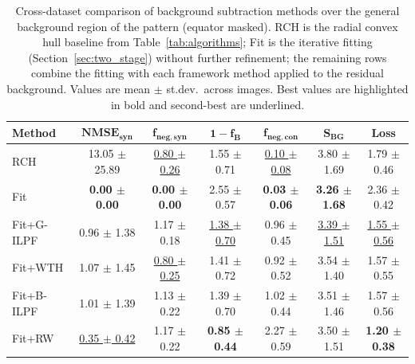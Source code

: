 \documentclass[journal,article,submit,moreauthors]{Definitions/mdpi}
\begin{document}
\begin{table}[H]
\caption{Cross-dataset comparison of background subtraction methods over the general background region of the pattern (equator masked). RCH is the radial convex hull baseline from Table~\ref{tab:algorithms}; Fit is the iterative fitting (Section~\ref{sec:two_stage}) without further refinement; the remaining rows combine the fitting with each framework method applied to the residual background. Values are mean $\pm$ st.dev.\ across images. Best values are highlighted in bold and second-best are underlined.}
\label{tab:two_stage_full}
\centering
\small
\setlength{\tabcolsep}{3pt}
\renewcommand{\arraystretch}{1.1}
\begin{tabular}{@{}lcccccc@{}}
\toprule
\textbf{Method} & $\mathbf{NMSE}_{\mathbf{syn}}$ & $\mathbf{f}_{\mathbf{neg,syn}}$ & $\mathbf{1-f_B}$ & $\mathbf{f}_{\mathbf{neg,con}}$ & $\mathbf{S}_{\mathbf{BG}}$ & \textbf{Loss} \\
\midrule
RCH & 13.05 $\pm$ 25.89 & \underline{0.80 $\pm$ 0.26} & 1.55 $\pm$ 0.71 & \underline{0.10 $\pm$ 0.08} & 3.80 $\pm$ 1.69 & 1.79 $\pm$ 0.46 \\
Fit & \textbf{0.00 $\pm$ 0.00} & \textbf{0.00 $\pm$ 0.00} & 2.55 $\pm$ 0.57 & \textbf{0.03 $\pm$ 0.06} & \textbf{3.26 $\pm$ 1.68} & 2.36 $\pm$ 0.42 \\
Fit+G-ILPF & 0.96 $\pm$ 1.38 & 1.17 $\pm$ 0.18 & \underline{1.38 $\pm$ 0.70} & 0.96 $\pm$ 0.45 & \underline{3.39 $\pm$ 1.51} & \underline{1.55 $\pm$ 0.56} \\
Fit+WTH & 1.07 $\pm$ 1.45 & \underline{0.80 $\pm$ 0.25} & 1.41 $\pm$ 0.72 & 0.92 $\pm$ 0.52 & 3.54 $\pm$ 1.40 & 1.57 $\pm$ 0.55 \\
Fit+B-ILPF & 1.01 $\pm$ 1.39 & 1.13 $\pm$ 0.22 & 1.39 $\pm$ 0.70 & 1.02 $\pm$ 0.44 & 3.51 $\pm$ 1.46 & 1.57 $\pm$ 0.56 \\
Fit+RW & \underline{0.35 $\pm$ 0.42} & 1.17 $\pm$ 0.22 & \textbf{0.85 $\pm$ 0.44} & 2.27 $\pm$ 0.59 & 3.50 $\pm$ 1.51 & \textbf{1.20 $\pm$ 0.38} \\
\bottomrule
\end{tabular}
\end{table}
\end{document}
